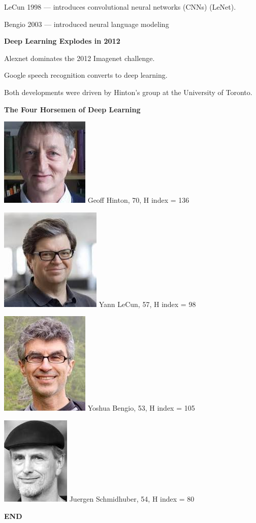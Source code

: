 \documentclass[landscape]{article}
\newcommand{\slide}[1]{\vfill
\eject
\centerline{\bf #1}
\vfill}
\begin{document}
{\vfill
LeCun 1998 --- introduces convolutional neural networks (CNNs) (LeNet).

\vfill
Bengio 2003 --- introduced neural language modeling

\slide{Deep Learning Explodes in 2012}

Alexnet dominates the 2012 Imagenet challenge.

\vfill
Google speech recognition converts to deep learning.

\vfill
Both developments were driven by Hinton's group at the University of Toronto.


\slide{The Four Horsemen of Deep Learning}

\includegraphics[height=1.0 in]{../images/Hinton} Geoff Hinton, 70, H index = 136

\vfill
\includegraphics[height=1.0 in]{../images/LeCun} Yann LeCun, 57, H index = 98

\vfill
\includegraphics[height=1.0 in]{../images/Bengio} Yoshua Bengio, 53, H index = 105

\vfill
\includegraphics[height=1.0 in]{../images/Schmidhuber.jpg} Juergen Schmidhuber, 54, H index = 80

\slide{END}

}
\end{document}
